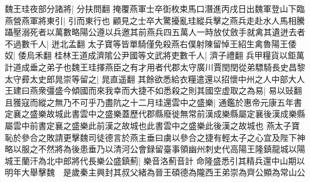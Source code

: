 魏王珪夜部分諸將|{
	分扶問翻}
掩覆燕軍士卒衘枚束馬口潛進丙戌日出魏軍登山下臨燕營燕軍將東引|{
	引而東行也}
顧見之士卒大驚擾亂珪縱兵擊之燕兵走赴水人馬相騰躡壓溺死者以萬數略陽公遵以兵邀其前燕兵四五萬人一時放仗斂手就禽其遺迸去者不過數千人|{
	迸北孟翻}
太子寶等皆單騎僅免殺燕右僕射陳留悼王紹生禽魯陽王倭奴|{
	倭烏禾翻}
桂林王道成濟隂公尹國等文武將吏數千人|{
	濟子禮翻}
兵甲糧貨以鉅萬計道成垂之弟子也魏王珪擇燕臣之有才用者代郡太守廣川賈閏閏從弟驃騎長史昌黎太守彛太史郎晁崇等留之|{
	晁直遥翻}
其餘欲悉給衣糧遣還以招懷中州之人中部大人王建曰燕衆彊盛今傾國而來我幸而大捷不如悉殺之則其國空虚取之為易|{
	易以䜴翻}
且獲寇而縱之無乃不可乎乃盡阬之十二月珪還雲中之盛樂|{
	通鑑於惠帝元康五年書定襄之盛樂故城此書雲中之盛樂蓋歷代郡縣廢徙無常前漢成樂縣屬定襄後漢成樂縣屬雲中前書定襄之盛樂此前漢之故城也此書雲中之盛樂此後漢之故城也}
燕太子寶恥於參合之敗請更擊魏司徒德言於燕主垂曰虜以參合之捷有輕太子之心宜及陛下神略以服之不然將為後患垂乃以清河公會録留臺事領幽州刺史代高陽王隆鎮龍城以陽城王蘭汗為北中郎將代長樂公盛鎮薊|{
	樂音洛薊音計}
命隆盛悉引其精兵還中山期以明年大舉擊魏　是歲秦主興封其叔父緒為晉王碩德為隴西王弟崇為齊公顯為常山公

